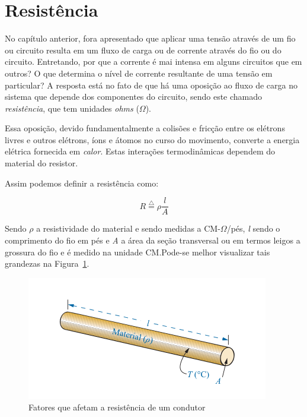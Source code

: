 \section{Resistência}

No capítulo anterior, fora apresentado que aplicar uma tensão através de um fio
ou circuito resulta em um fluxo de carga ou de corrente através do fio ou do
circuito. Entretando, por que a corrente é mai intensa em alguns circuitos que
em outros? O que determina o nível de corrente resultante de uma tensão em
particular? A resposta está no fato de que há uma oposição ao fluxo de carga no
sistema que depende dos componentes do circuito, sendo este chamado
\textit{resistência}, que tem unidades \textit{ohms} (\( \Omega \)).

Essa oposição, devido fundamentalmente a colisões e fricção entre os elétrons
livres e outros elétrons, íons e átomos no curso do movimento, converte a
energia elétrica fornecida em \textit{calor}. Estas interações termodinâmicas
dependem do material do resistor.

Assim podemos definir a resistência como:

\begin{equation}
	\label{eq:lei-de-ohm}
	R \overset{\triangle}{=} \rho \frac{l}{A}
\end{equation}

Sendo \textit{\( \rho \)} a resistividade do material e sendo medidas a CM-\(
\Omega \)/pés, \textit{l} sendo o comprimento do fio em pés e \textit{A} a área
da seção transversal ou em termos leigos a grossura do fio e é medido na unidade
CM.\@ Pode-se melhor visualizar tais grandezas na Figura~\ref{fig:fig4}.

\begin{figure}[H]
	\centering
	\setlength{\fboxsep}{0pt}
	\includegraphics[height=0.15\textwidth]{./fig/fig4.png}
	\caption{Fatores que afetam a resistência de um condutor}
	\label{fig:fig4}
\end{figure}


